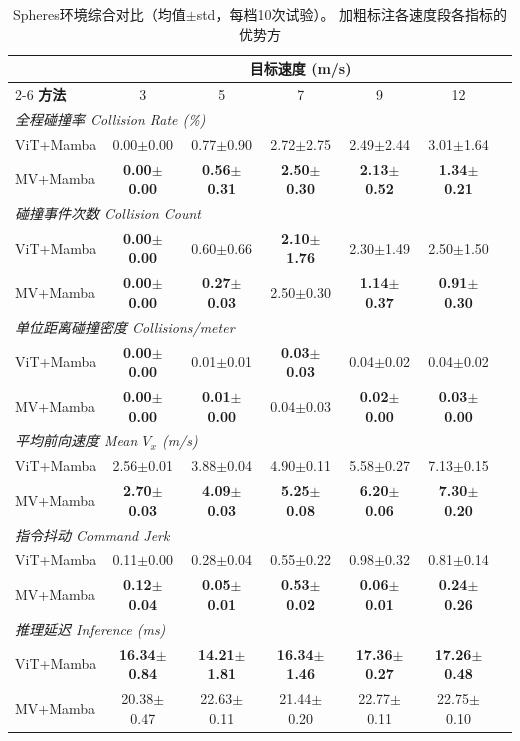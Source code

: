\FloatBarrier
\begin{table}[!htbp]
\centering
\caption{Spheres环境综合对比（均值$\pm$std，每档10次试验）。
加粗标注各速度段各指标的优势方}
\label{tab:ch5_spheres_full}
\begin{tabular}{lcccccc}
\toprule
 & \multicolumn{5}{c}{\textbf{目标速度 (m/s)}} \\
\cmidrule(lr){2-6}
\textbf{方法} & 3 & 5 & 7 & 9 & 12 \\
\midrule
\multicolumn{6}{l}{\textit{全程碰撞率 Collision Rate (\%)}} \\
ViT+Mamba & 0.00$\pm$0.00 & 0.77$\pm$0.90 & 2.72$\pm$2.75 & 2.49$\pm$2.44 & 3.01$\pm$1.64 \\
MV+Mamba & \textbf{0.00$\pm$0.00} & \textbf{0.56$\pm$0.31} & \textbf{2.50$\pm$0.30} & \textbf{2.13$\pm$0.52} & \textbf{1.34$\pm$0.21} \\
\midrule
\multicolumn{6}{l}{\textit{碰撞事件次数 Collision Count}} \\
ViT+Mamba & \textbf{0.00$\pm$0.00} & 0.60$\pm$0.66 & \textbf{2.10$\pm$1.76} & 2.30$\pm$1.49 & 2.50$\pm$1.50 \\
MV+Mamba & \textbf{0.00$\pm$0.00} & \textbf{0.27$\pm$0.03} & 2.50$\pm$0.30 & \textbf{1.14$\pm$0.37} & \textbf{0.91$\pm$0.30} \\
\midrule
\multicolumn{6}{l}{\textit{单位距离碰撞密度 Collisions/meter}} \\
ViT+Mamba & \textbf{0.00$\pm$0.00} & 0.01$\pm$0.01 & \textbf{0.03$\pm$0.03} & 0.04$\pm$0.02 & 0.04$\pm$0.02 \\
MV+Mamba & \textbf{0.00$\pm$0.00} & \textbf{0.01$\pm$0.00} & 0.04$\pm$0.03 & \textbf{0.02$\pm$0.00} & \textbf{0.03$\pm$0.00} \\
\midrule
\multicolumn{6}{l}{\textit{平均前向速度 Mean $V_x$ (m/s)}} \\
ViT+Mamba & 2.56$\pm$0.01 & 3.88$\pm$0.04 & 4.90$\pm$0.11 & 5.58$\pm$0.27 & 7.13$\pm$0.15 \\
MV+Mamba & \textbf{2.70$\pm$0.03} & \textbf{4.09$\pm$0.03} & \textbf{5.25$\pm$0.08} & \textbf{6.20$\pm$0.06} & \textbf{7.30$\pm$0.20} \\
\midrule
\multicolumn{6}{l}{\textit{指令抖动 Command Jerk}} \\
ViT+Mamba & 0.11$\pm$0.00 & 0.28$\pm$0.04 & 0.55$\pm$0.22 & 0.98$\pm$0.32 & 0.81$\pm$0.14 \\
MV+Mamba & \textbf{0.12$\pm$0.04} & \textbf{0.05$\pm$0.01} & \textbf{0.53$\pm$0.02} & \textbf{0.06$\pm$0.01} & \textbf{0.24$\pm$0.26} \\
\midrule
\multicolumn{6}{l}{\textit{推理延迟 Inference (ms)}} \\
ViT+Mamba & \textbf{16.34$\pm$0.84} & \textbf{14.21$\pm$1.81} & \textbf{16.34$\pm$1.46} & \textbf{17.36$\pm$0.27} & \textbf{17.26$\pm$0.48} \\
MV+Mamba & 20.38$\pm$0.47 & 22.63$\pm$0.11 & 21.44$\pm$0.20 & 22.77$\pm$0.11 & 22.75$\pm$0.10 \\
\bottomrule
\end{tabular}
\end{table}


